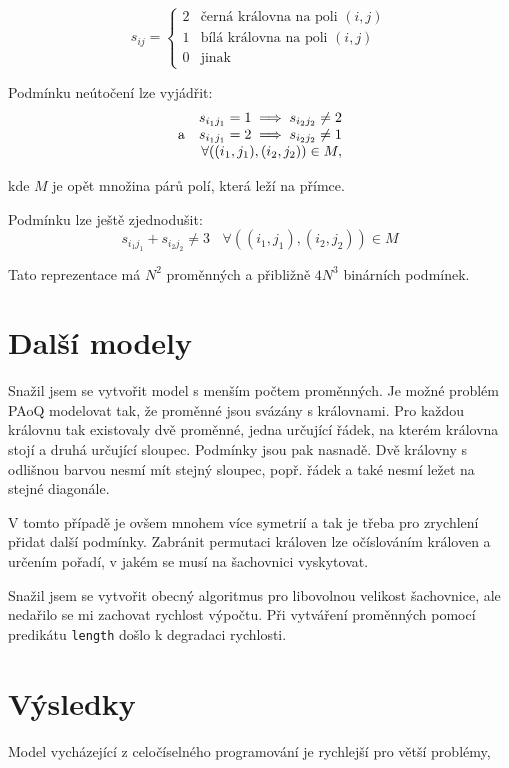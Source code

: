 \documentclass[11pt]{article}
\begin{document}
$$
    s_{ij} = \begin{cases}
        2 & \text{černá královna na poli $(i,j)$}\\
        1 & \text{bílá královna na poli $(i,j)$}\\
        0 & \text{jinak}
    \end{cases}
$$

Podmínku neútočení lze vyjádřit:
$$
\begin{array}[b]{rr}
    & s_{i_1 j_1} = 1 \implies s_{i_2 j_2} \ne 2 \\
    \text{a} & s_{i_1 j_1} = 2 \implies s_{i_2 j_2} \ne 1 \\
             & \forall ((i_1, j_1), (i_2, j_2)) \in M,
\end{array}
$$

kde $M$ je opět množina párů polí, která leží na přímce.

Podmínku lze ještě zjednodušit:
$$ s_{i_1 j_1} + s_{i_2 j_2} \ne 3 ~~~~ \forall ((i_1, j_1), (i_2, j_2)) \in M$$

Tato reprezentace má $N^2$ proměnných a přibližně $4N^3$ binárních podmínek.

\section{Další modely}

Snažil jsem se vytvořit model s menším počtem proměnných. Je možné problém PAoQ
modelovat tak, že proměnné jsou svázány s královnami. Pro každou královnu tak
existovaly dvě proměnné, jedna určující řádek, na kterém královna stojí a druhá
určující sloupec. Podmínky jsou pak nasnadě. Dvě královny s odlišnou barvou
nesmí mít stejný sloupec, popř. řádek a také nesmí ležet na stejné diagonále.

V tomto případě je ovšem mnohem více symetrií a tak je třeba pro zrychlení
přidat další podmínky. Zabránit permutaci královen lze očíslováním královen a
určením pořadí, v jakém se musí na šachovnici vyskytovat.

Snažil jsem se vytvořit obecný algoritmus pro libovolnou velikost šachovnice,
ale nedařilo se mi zachovat rychlost výpočtu. Při vytváření proměnných pomocí
predikátu {\tt length} došlo k degradaci rychlosti.

\section{Výsledky}

Model vycházející z celočíselného programování je rychlejší pro větší problémy, 
\end{document}
